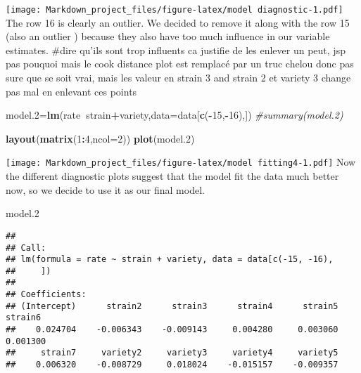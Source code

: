 \documentclass[
]{article}
\newenvironment{Shaded}{\begin{snugshade}}{\end{snugshade}}
\newcommand{\CommentTok}[1]{\textcolor[rgb]{0.56,0.35,0.01}{\textit{#1}}}
\newcommand{\DataTypeTok}[1]{\textcolor[rgb]{0.13,0.29,0.53}{#1}}
\newcommand{\DecValTok}[1]{\textcolor[rgb]{0.00,0.00,0.81}{#1}}
\newcommand{\FloatTok}[1]{\textcolor[rgb]{0.00,0.00,0.81}{#1}}
\newcommand{\KeywordTok}[1]{\textcolor[rgb]{0.13,0.29,0.53}{\textbf{#1}}}
\newcommand{\NormalTok}[1]{#1}
\newcommand{\OperatorTok}[1]{\textcolor[rgb]{0.81,0.36,0.00}{\textbf{#1}}}
\begin{document}
\texttt{[image: Markdown\_project\_files/figure-latex/model diagnostic-1.pdf]}
The row 16 is clearly an outlier. We decided to remove it along with the
row 15 (also an outlier ) because they also have too much influence in
our variable estimates. \#dire qu'ils sont trop influents ca justifie de
les enlever un peut, jsp pas pouquoi mais le cook distance plot est
remplacé par un truc chelou donc pas sure que se soit vrai, mais les
valeur en strain 3 and strain 2 et variety 3 change pas mal en enlevant
ces points

\begin{Shaded}
\begin{Highlighting}[]
\NormalTok{model}\FloatTok{.2}\NormalTok{=}\KeywordTok{lm}\NormalTok{(rate}\OperatorTok{~}\NormalTok{strain}\OperatorTok{+}\NormalTok{variety,}\DataTypeTok{data=}\NormalTok{data[}\KeywordTok{c}\NormalTok{(}\OperatorTok{-}\DecValTok{15}\NormalTok{,}\OperatorTok{-}\DecValTok{16}\NormalTok{),])}
\CommentTok{#summary(model.2)}
\end{Highlighting}
\end{Shaded}

\begin{Shaded}
\begin{Highlighting}[]
\KeywordTok{layout}\NormalTok{(}\KeywordTok{matrix}\NormalTok{(}\DecValTok{1}\OperatorTok{:}\DecValTok{4}\NormalTok{,}\DataTypeTok{ncol=}\DecValTok{2}\NormalTok{))}
\KeywordTok{plot}\NormalTok{(model}\FloatTok{.2}\NormalTok{)}
\end{Highlighting}
\end{Shaded}

\texttt{[image: Markdown\_project\_files/figure-latex/model fitting4-1.pdf]}
Now the different diagnostic plots suggest that the model fit the data
much better now, so we decide to use it as our final model.

\begin{Shaded}
\begin{Highlighting}[]
\NormalTok{model}\FloatTok{.2}
\end{Highlighting}
\end{Shaded}

\begin{verbatim}
## 
## Call:
## lm(formula = rate ~ strain + variety, data = data[c(-15, -16), 
##     ])
## 
## Coefficients:
## (Intercept)      strain2      strain3      strain4      strain5      strain6  
##    0.024704    -0.006343    -0.009143     0.004280     0.003060     0.001300  
##     strain7     variety2     variety3     variety4     variety5  
##    0.006320    -0.008729     0.018024    -0.015157    -0.009357
\end{verbatim}
\end{document}
